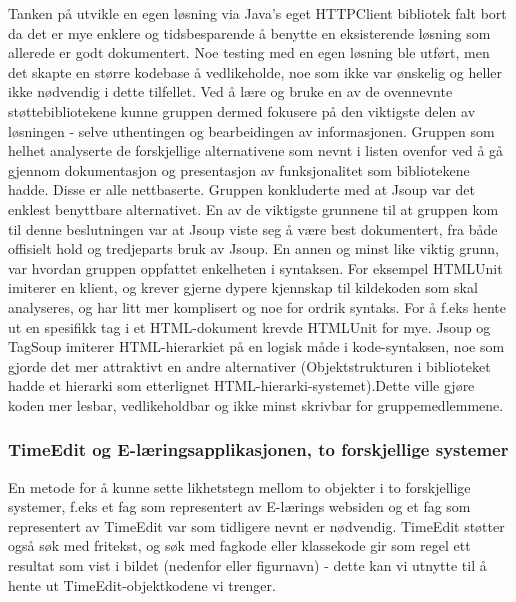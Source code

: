 \documentclass[../main.tex]{subfiles}
\begin{document}
Tanken på utvikle en egen løsning via Java’s eget HTTPClient bibliotek falt bort da det er mye enklere og tidsbesparende å benytte en eksisterende løsning som allerede er godt dokumentert. Noe testing med en egen løsning ble utført, men det skapte en større kodebase å vedlikeholde, noe som ikke var ønskelig og heller ikke nødvendig i dette tilfellet. Ved å lære og bruke en av de ovennevnte støttebibliotekene kunne gruppen dermed fokusere på den viktigste delen av løsningen - selve uthentingen og bearbeidingen av informasjonen.\newline
\newline
Gruppen som helhet analyserte de forskjellige alternativene som nevnt i listen ovenfor ved å gå gjennom dokumentasjon og presentasjon av funksjonalitet som bibliotekene hadde. Disse er alle nettbaserte.
Gruppen konkluderte med at Jsoup var det enklest benyttbare alternativet. En av de viktigste grunnene til at gruppen kom til denne beslutningen var at Jsoup viste seg å være best dokumentert, fra både offisielt hold og tredjeparts bruk av Jsoup. 
En annen og minst like viktig grunn, var hvordan gruppen oppfattet enkelheten i syntaksen. For eksempel HTMLUnit imiterer en klient, og krever gjerne dypere kjennskap til kildekoden som skal analyseres, og har litt mer komplisert og noe for ordrik syntaks. For å f.eks hente ut en spesifikk tag i et HTML-dokument krevde HTMLUnit for mye.
Jsoup og TagSoup imiterer HTML-hierarkiet på en logisk måde i kode-syntaksen, noe som gjorde det mer attraktivt en andre alternativer (Objektstrukturen i biblioteket hadde et hierarki som etterlignet HTML-hierarki-systemet).Dette ville gjøre koden mer lesbar, vedlikeholdbar og ikke minst skrivbar for gruppemedlemmene. 

\subsubsection{TimeEdit og E-læringsapplikasjonen, to forskjellige systemer}

En metode for å kunne sette likhetstegn mellom to objekter i to forskjellige systemer, f.eks et fag som representert av E-lærings websiden og et fag som representert av TimeEdit var som tidligere nevnt er nødvendig.\newline
\newline
TimeEdit støtter også søk med fritekst, og søk med fagkode eller klassekode gir som regel ett resultat som vist i bildet (nedenfor eller figurnavn) - dette kan vi utnytte til å hente ut TimeEdit-objektkodene vi trenger.
\end{document}
